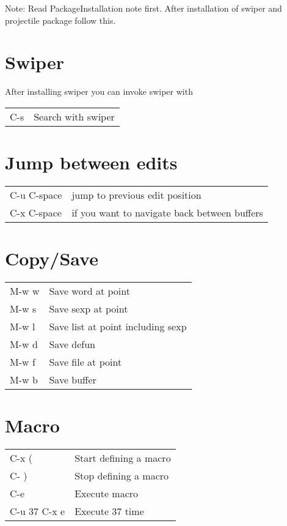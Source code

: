 \documentclass[11pt]{article}
\author{Pramod Nepal}
\date{\today}
\title{}
\begin{document}
\tableofcontents

Note: Read PackageInstallation note first. After installation of swiper and projectile package follow this.\\


\section{Swiper}
\label{sec:orgdb1907a}
After installing swiper you can invoke swiper with\\
\begin{center}
\begin{tabular}{ll}
C-s & Search with swiper\\
\end{tabular}
\end{center}

\section{Jump between edits}
\label{sec:org94dde7b}
\begin{center}
\begin{tabular}{ll}
\hline
C-u C-space & jump to previous edit position\\
C-x C-space & if you want to navigate back between buffers\\
\end{tabular}
\end{center}

\section{Copy/Save}
\label{sec:org099327a}
\begin{center}
\begin{tabular}{ll}
\hline
M-w w & Save word at point\\
M-w s & Save sexp at point\\
M-w l & Save list at point including sexp\\
M-w d & Save defun\\
M-w f & Save file at point\\
M-w b & Save buffer\\
\end{tabular}
\end{center}

\section{Macro}
\label{sec:org5ce70e2}
\begin{center}
\begin{tabular}{ll}
\hline
C-x ( & Start defining a macro\\
C- ) & Stop defining a macro\\
C-e & Execute macro\\
C-u 37 C-x e & Execute 37 time\\
\end{tabular}
\end{center}
\end{document}
